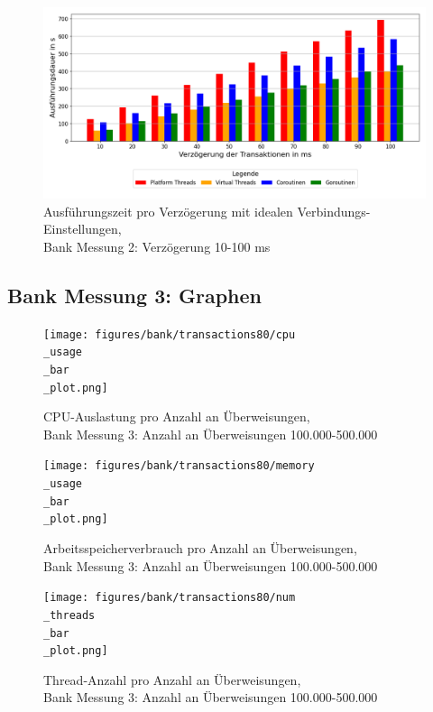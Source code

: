 \documentclass[fontsize=12pt,paper=a4,twoside=semi,parskip=half-,headsepline,headinclude]{scrreprt}
\begin{document}
\begin{figure}[H]
	\centering
	\includegraphics[scale=0.5]{figures/bank/delayIdeal/execution_time_plot.png}
	\caption{Ausführungszeit pro Verzögerung mit idealen Verbindungs-Einstellungen,\\ Bank Messung 2: Verzögerung 10-100 ms}
	\label{fig:bankdelayIdealZeit}
\end{figure}

\subsection{Bank Messung 3: Graphen}

\begin{figure}[H]
	\centering
	\texttt{[image: figures/bank/transactions80/cpu\\\_usage\\\_bar\\\_plot.png]}
	\caption{CPU-Auslastung pro Anzahl an Überweisungen,\\ Bank Messung 3: Anzahl an Überweisungen 100.000-500.000}
	\label{fig:bankTransactions80CPU}
\end{figure}

\begin{figure}[H]
	\centering
	\texttt{[image: figures/bank/transactions80/memory\\\_usage\\\_bar\\\_plot.png]}
	\caption{Arbeitsspeicherverbrauch pro Anzahl an Überweisungen,\\ Bank Messung 3: Anzahl an Überweisungen 100.000-500.000}
	\label{fig:bankTransactions80RAM}
\end{figure}

\begin{figure}[H]
	\centering
	\texttt{[image: figures/bank/transactions80/num\\\_threads\\\_bar\\\_plot.png]}
	\caption{Thread-Anzahl pro Anzahl an Überweisungen,\\ Bank Messung 3: Anzahl an Überweisungen 100.000-500.000}
	\label{fig:bankTransactions80Threads}
\end{figure}
\end{document}
